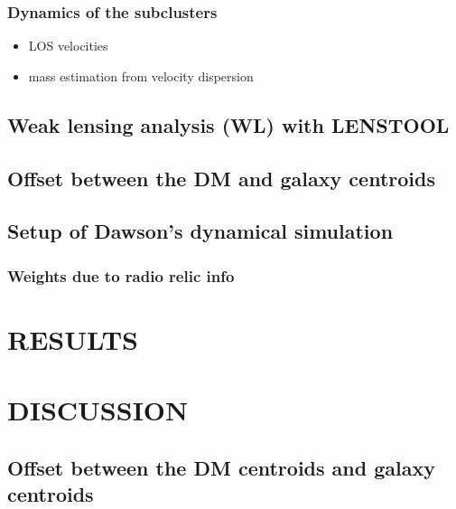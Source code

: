 \documentclass[letterpaper,useAMS,usenatbib]{mn2e}
\begin{document}
\subsubsection{Dynamics of the subclusters}
\begin{itemize}
		\item LOS velocities
		\item mass estimation from velocity dispersion 
\end{itemize}

\subsection{Weak lensing analysis (WL) with LENSTOOL}


\subsection{Offset between the DM and galaxy centroids}

\subsection{Setup of Dawson's dynamical simulation}
\subsubsection{Weights due to radio relic info}

\section{RESULTS}




\section{DISCUSSION}
\subsection{Offset between the DM centroids and galaxy centroids}
\end{document}
